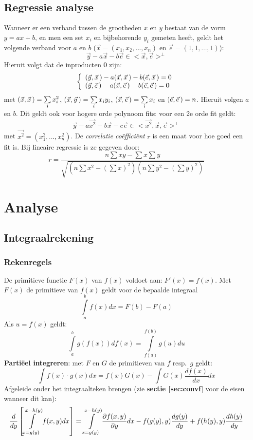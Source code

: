 \section{Regressie analyse}
Wanneer er een verband tussen de grootheden $x$ en $y$ bestaat van de vorm
$y=ax+b$, en men een set $x_i$ en bijbehorende $y_i$ gemeten heeft, geldt het
volgende verband voor $a$ en $b$ ($\vec{x}=(x_1,x_2,...,x_n)$ en
$\vec{e}=(1,1,...,1)$):
\[
\vec{y}-a\vec{x}-b\vec{e}\in<\vec{x},\vec{e}>^\perp
\]
Hieruit volgt dat de inproducten 0 zijn:
\[
\left\{
\begin{array}{l}
(\vec{y},\vec{x}\,)-a(\vec{x},\vec{x}\,)-b(\vec{e},\vec{x}\,)=0\\
(\vec{y},\vec{e}\,)-a(\vec{x},\vec{e}\,)-b(\vec{e},\vec{e}\,)=0
\end{array}\right.
\]
met $(\vec{x},\vec{x}\,)=\sum\limits_i x_i^2$, $(\vec{x},\vec{y}\,)=\sum\limits_ix_iy_i$,
$(\vec{x},\vec{e}\,)=\sum\limits_ix_i$ en $(\vec{e},\vec{e}\,)=n$.
Hieruit volgen $a$ en $b$.
\npar
Dit geldt ook voor hogere orde polynoom fits: voor een 2e orde fit geldt:
\[
\vec{y}-a\vec{x^2}-b\vec{x}-c\vec{e}\in<\vec{x^2},\vec{x},\vec{e}>^\perp
\]
met $\vec{x^2}=(x_1^2,...,x_n^2)$.
\npar
De {\it correlatie co\"effici\"ent} $r$ is een maat voor hoe goed een fit is.
Bij lineaire regressie is ze gegeven door:
\[
r=\frac{n\sum xy-\sum x\sum y}{\sqrt{(n\sum x^2-(\sum x)^2)(n\sum y^2-(\sum y)^2)}}
\]


\chapter{Analyse}
\section{Integraalrekening}
\subsection{Rekenregels}
De primitieve functie $F(x)$ van $f(x)$ voldoet aan: $F'(x)=f(x)$. Met
$F(x)$ de primitieve van $f(x)$ geldt voor de bepaalde integraal
\[
\int\limits_a^bf(x)dx=F(b)-F(a)
\]
Als $u=f(x)$ geldt:
\[
\int\limits_a^bg(f(x))df(x)=\int\limits_{f(a)}^{f(b)}g(u)du
\]
{\bf Parti\"eel integreren}: met $F$ en $G$ de primitieven van $f$ resp.\ $g$
geldt:
\[
\int f(x)\cdot g(x)dx=f(x)G(x)-\int G(x)\frac{df(x)}{dx}dx
\]
Afgeleide onder het integraalteken brengen (zie {\bf sectie \ref{sec:convf}}
voor de eisen wanneer dit kan):
\[
\frac{d}{dy}\left[\int\limits_{x=g(y)}^{x=h(y)}f(x,y)dx\right]=
\int\limits_{x=g(y)}^{x=h(y)}\frac{\partial f(x,y)}{\partial y}dx-f(g(y),y)\frac{dg(y)}{dy}+f(h(y),y)\frac{dh(y)}{dy}
\]

